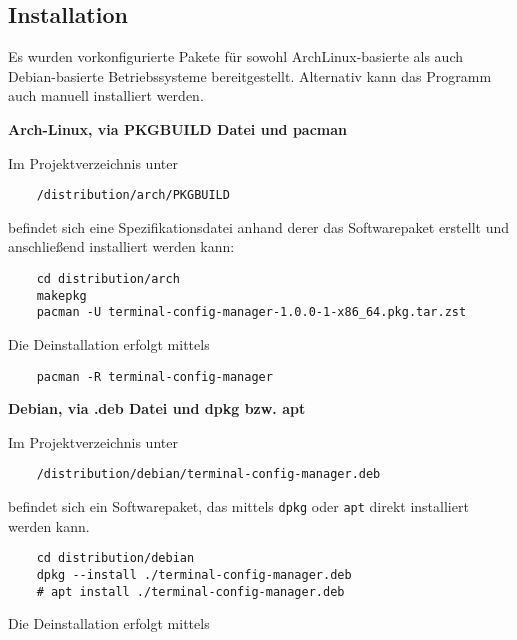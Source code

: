 \subsection{Installation}
Es wurden vorkonfigurierte Pakete für sowohl ArchLinux-basierte als auch
Debian-basierte Betriebssysteme bereitgestellt. Alternativ
kann das Programm auch manuell installiert werden.

\begin{center}
    \textbf{Arch-Linux, via PKGBUILD Datei und pacman}
\end{center}

Im Projektverzeichnis unter

\begin{verbatim}
	/distribution/arch/PKGBUILD
\end{verbatim}

befindet sich eine Spezifikationsdatei anhand derer das Softwarepaket
erstellt und anschließend installiert werden kann:

\begin{verbatim}
	cd distribution/arch
	makepkg
	pacman -U terminal-config-manager-1.0.0-1-x86_64.pkg.tar.zst
\end{verbatim}

Die Deinstallation erfolgt mittels

\begin{verbatim}
	pacman -R terminal-config-manager
\end{verbatim}

\begin{center}
    \textbf{Debian, via .deb Datei und dpkg bzw. apt}
\end{center}

Im Projektverzeichnis unter

\begin{verbatim}
	/distribution/debian/terminal-config-manager.deb
\end{verbatim}

befindet sich ein Softwarepaket, das mittels \texttt{dpkg} oder
\texttt{apt} direkt installiert werden kann.

\begin{verbatim}
	cd distribution/debian
	dpkg --install ./terminal-config-manager.deb
	# apt install ./terminal-config-manager.deb
\end{verbatim}

Die Deinstallation erfolgt mittels

